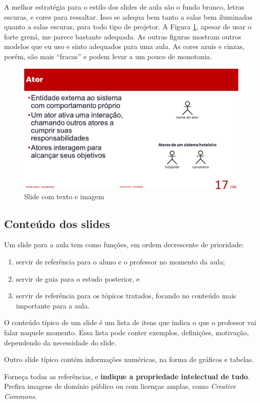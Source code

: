 A melhor estratégia para o estilo dos slides de aula são o fundo branco, letras escuras, e cores para ressaltar. Isso se adequa bem tanto a salas bem iluminadas quanto a salas escuras, para todo tipo de projetor. A Figura \ref{fig:teximag}, apesar de usar o forte grená, me parece bastante adequada. As outras figuras  mostram outros modelos que eu uso e sinto adequados para uma aula. As cores azuis e cinzas, porém, são mais ``fracas'' e podem levar a um pouco de monotonia.

\begin{figure}[hbt]
    \centering
    \includegraphics[width=\tam\linewidth]{imagens/slidecomimage.png}
    \caption{Slide com texto e imagem}
    \label{fig:teximag}
\end{figure}

\subsection{Conteúdo dos slides}

Um slide para a aula tem como funções, em ordem decrescente de prioridade:
\begin{enumerate}
    \item servir de referência para o aluno e o professor no momento da aula;
    \item servir de guia para o estudo posterior, e
    \item servir de referência para os tópicos tratados, focando no conteúdo mais importante para a aula.
\end{enumerate}

O conteúdo típico de um slide é um lista de itens que indica o que o professor vai falar naquele momento. Essa lista pode conter exemplos, definições, motivação, dependendo da necessidade do slide.

Outro slide típico contém informações numéricas, na forma de gráficos e tabelas.

Forneça todas as referências, e \textbf{indique a propriedade intelectual de tudo}. Prefira imagens de domínio público ou com licenças amplas, como \textit{Creative Commons}.


